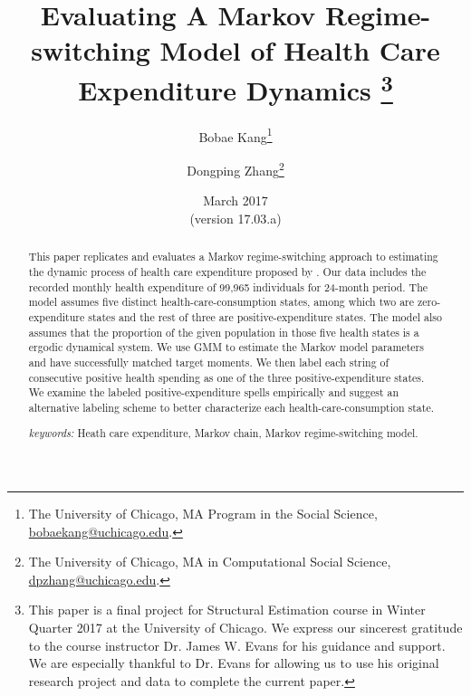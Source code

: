 \documentclass[letterpaper,12pt]{article}
\theoremstyle{definition}
\begin{document}
\begin{titlepage}
\title{Evaluating A Markov Regime-switching Model of Health Care Expenditure Dynamics \thanks{This paper is a final project for Structural Estimation course in Winter Quarter 2017 at the University of Chicago. We express our sincerest gratitude to the course instructor Dr. James W. Evans for his guidance and support. We are especially thankful to Dr. Evans for allowing us to use his original research project and data to complete the current paper.}
       }
       \author{
  Bobae Kang\footnote{The University of Chicago, MA Program in the Social Science, \href{mailto:bobaekang@uchicago.edu}{bobaekang@uchicago.edu}.} \\[-2pt]
  \and
  Dongping Zhang\footnote{The University of Chicago, MA in Computational Social Science, \href{mailto:dpzhang@uchicago.edu}{dpzhang@uchicago.edu}.}}
\date{March 2017 \\
  \scriptsize{(version 17.03.a)}}
\maketitle
\vspace{-9mm}
\begin{abstract}
\small{This paper replicates and evaluates a Markov regime-switching approach to estimating the dynamic process of health care expenditure proposed by \citet{evans}. Our data includes the recorded monthly health expenditure of 99,965 individuals for 24-month period. The model assumes five distinct health-care-consumption states, among which two are zero-expenditure states and the rest of three are positive-expenditure states. The model also assumes that the proportion of the given population in those five health states is a ergodic dynamical system. We use GMM to estimate the Markov model parameters and have successfully matched target moments. We then label each string of consecutive positive health spending as one of the three positive-expenditure states. We examine the labeled positive-expenditure spells empirically and suggest an alternative labeling scheme to better characterize each health-care-consumption state.
\vspace{3mm}

\noindent\textit{keywords:}\: Heath care expenditure, Markov chain, Markov regime-switching model.

\vspace{3mm}
}

\end{abstract}
\thispagestyle{empty}
\end{titlepage}
\end{document}
